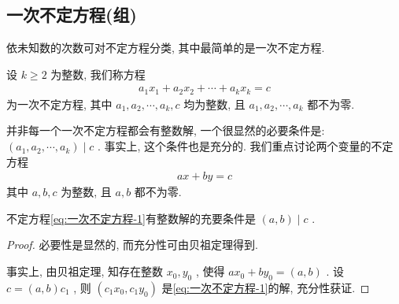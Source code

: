 \subsection{一次不定方程(组)}
依未知数的次数可对不定方程分类, 其中最简单的是一次不定方程.

设 $k \geqslant 2$ 为整数, 我们称方程
\begin{align*}
	a_{1} x_{1}+a_{2} x_{2}+\cdots+a_{k} x_{k}=c
\end{align*}
为一次不定方程, 其中 $a_{1} ,  a_{2} ,  \cdots ,  a_{k} ,  c$ 均为整数, 且 $a_{1} ,  a_{2} ,  \cdots ,  a_{k}$ 都不为零.

并非每一个一次不定方程都会有整数解, 一个很显然的必要条件是:  $\left(a_{1}, a_{2}, \cdots, a_{k}\right) \mid c$ . 事实上, 这个条件也是充分的. 我们重点讨论两个变量的不定方程
\begin{align}\label{eq:一次不定方程-1}
	a x+b y=c
\end{align}
其中 $a ,  b ,  c$ 为整数, 且 $a ,  b$ 都不为零.

\begin{theorem}\label{thm:一次不定方程-1}
	不定方程\ref{eq:一次不定方程-1}有整数解的充要条件是 $(a, b) \mid c$ .
\end{theorem}
\begin{proof}
	必要性是显然的, 而充分性可由贝祖定理得到.

	事实上, 由贝祖定理, 知存在整数 $x_{0} ,  y_{0}$ , 使得 $a x_{0}+b y_{0}=(a, b)$ . 设 $c=(a, b) c_{1}$ , 则 $\left(c_{1} x_{0}, c_{1} y_{0}\right)$ 是\autoref{eq:一次不定方程-1}的解, 充分性获证.
\end{proof}

